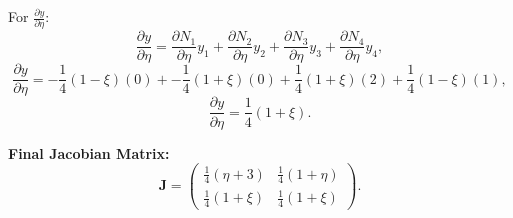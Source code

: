 \documentclass[11pt]{article}
\begin{document}
For \(\frac{\partial y}{\partial \eta}\):
\[
\frac{\partial y}{\partial \eta} = \frac{\partial N_1}{\partial \eta} y_1 + \frac{\partial N_2}{\partial \eta} y_2 + \frac{\partial N_3}{\partial \eta} y_3 + \frac{\partial N_4}{\partial \eta} y_4,
\]
\[
\frac{\partial y}{\partial \eta} = -\frac{1}{4}(1-\xi)(0) + -\frac{1}{4}(1+\xi)(0) + \frac{1}{4}(1+\xi)(2) + \frac{1}{4}(1-\xi)(1),
\]
\[
\frac{\partial y}{\partial \eta} = \frac{1}{4}(1+\xi).
\]

\textbf{Final Jacobian Matrix:}
\[
\mathbf{J} =
\begin{pmatrix}
\frac{1}{4}(\eta + 3) & \frac{1}{4}(1+\eta) \\
\frac{1}{4}(1+\xi) & \frac{1}{4}(1+\xi)
\end{pmatrix}.
\]
\end{document}

